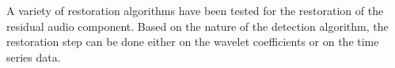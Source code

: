



A variety of restoration algorithms have been tested for the restoration of the residual audio component. Based on the nature of the detection algorithm, the restoration step can be done either on the wavelet coefficients or on the time series data.











